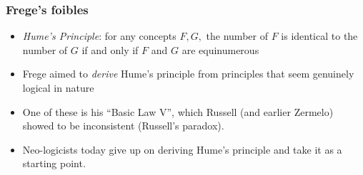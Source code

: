 \begin{frame}
\frametitle{Frege's foibles}

\begin{itemize}[<+->]

\item \emph{Hume's Principle}: for any concepts $F, G,$ the number of $F $ is identical to the number of $G $ if and only if $F$ and $G$ are equinumerous

\item Frege aimed to \textit{derive} Hume's principle from principles that seem genuinely logical in nature

\item One of these is his ``Basic Law V'', which Russell (and earlier Zermelo) showed to be inconsistent (Russell's paradox). 

\item Neo-logicists today give up on deriving Hume's principle and take it as a starting point. 


\end{itemize}
\end{frame}



